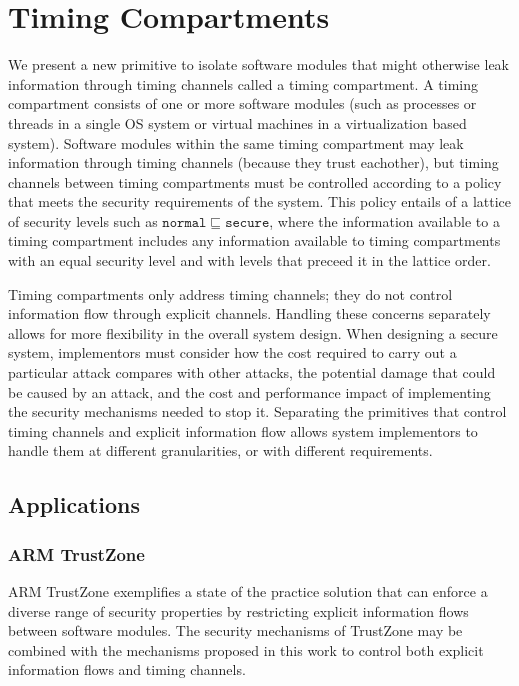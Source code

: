 \section{Timing Compartments}

    We present a new primitive to isolate software modules that might otherwise 
    leak information through timing channels called a timing compartment. A 
    timing compartment consists of one or more software modules (such as 
    processes or threads in a single OS system or virtual machines in a 
    virtualization based system).  Software modules within the same timing 
    compartment may leak information through timing channels (because they 
    trust eachother), but timing channels between timing compartments must be 
    controlled according to a policy that meets the security requirements of 
    the system. This policy entails of a lattice of security levels such as 
    $\mathtt{normal} \sqsubseteq \mathtt{secure}$, where the information 
    available to a timing compartment includes any information available to 
    timing compartments with an equal security level and with levels that 
    preceed it in the lattice order.

    Timing compartments only address timing channels; they do not control 
    information flow through explicit channels. Handling these concerns 
    separately allows for more flexibility in the overall system design. 
    When designing a secure system, implementors 
    must consider how the cost required to carry out a particular attack 
    compares with other attacks, the potential damage that could be caused by 
    an attack, and the cost and performance impact of implementing the security 
    mechanisms needed to stop it. Separating the primitives that control timing 
    channels and explicit information flow allows system implementors to handle 
    them at different granularities, or with different requirements.

    \subsection{ Applications }
    \subsubsection{ARM TrustZone}
    ARM TrustZone exemplifies a state of the practice solution that can enforce 
    a diverse range of security properties by restricting explicit information 
    flows between software modules. The security mechanisms of TrustZone may be 
    combined with the mechanisms proposed in this work to control both explicit 
    information flows and timing channels.

